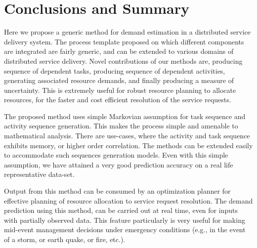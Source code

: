 \documentclass[twoside,leqno,twocolumn]{article}
\begin{document}
\section{Conclusions and Summary}
Here we propose a generic method for demand estimation in a distributed service delivery system. The process template proposed on which different components are integrated are fairly generic, and can be extended to various domains of distributed service delivery. Novel contributions of our methods are, producing sequence of dependent tasks, producing sequence of dependent activities,  generating associated resource demands, and finally producing a measure of uncertainty. This is extremely useful for robust resource planning to allocate resources, for the faster and cost efficient resolution of the service requests. 
\par
The proposed method uses simple Markovian assumption for task sequence and activity sequence generation. This makes the process simple and amenable to mathematical analysis. There are use-cases, where the activity and task sequence exhibits memory, or higher order correlation. The methods can be extended easily to accommodate such sequences generation models. Even with this simple assumption, we have attained a very good prediction accuracy on a real life representative data-set. 
\par
Output from this method can be consumed by an optimization planner for effective planning of resource allocation to service request resolution. The demand prediction using this method, can be carried out at real time, even for inputs with partially observed data. This feature particularly is very useful for making mid-event management decisions under emergency conditions (e.g., in the event of a storm, or earth quake, or fire, etc.).


 
\end{document}
